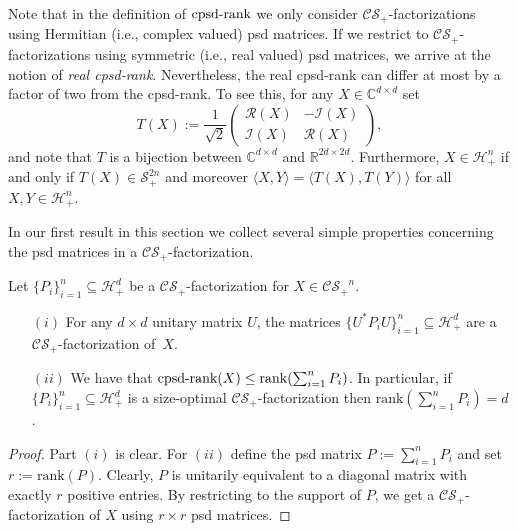 \documentclass{siamart}
\begin{document}
{{{{Note that  in the definition of ${\mathrm{cpsd}\textnormal{-rank}}$ we only consider ${\mathcal{CS}_+}$-factorizations using  Hermitian (i.e., complex valued) psd matrices. If we  restrict to ${\mathcal{CS}_+}$-factorizations using  symmetric (i.e., real valued) psd matrices, we arrive at the notion of {\em real cpsd-rank}.  Nevertheless, the real cpsd-rank can differ at most by a  factor of two from the cpsd-rank.
To see this,  for  any $X\in {\mathbb{C}}^{d\times
d}$ set
 \begin{equation}\label{eq:comtorealpsd}
T(X) := \dfrac{1}{\sqrt 2} \begin{pmatrix} \mathcal{R}(X) & -\mathcal{I}(X)\\ \mathcal{I}(X)&  \mathcal{R}(X)\end{pmatrix},
\end{equation}
and note  that $T$ is a bijection   between ${\mathbb{C}}^{d\times d}$   and   ${\mathbb{R}}^{ 2d\times 2d}$. Furthermore,    $X\in {\mathcal{H}}^n_+$  if and only if $T(X)\in \mathcal{S}^{2n}_+$  and moreover  ${\langle {X}, {Y} \rangle} = {\langle {T(X)}, {T(Y)} \rangle}$ for all $X,Y\in {\mathcal{H}}^n_+$.

In our first result in this section we collect several simple properties concerning  the psd matrices  in a ${\mathcal{CS}_+}$-factorization.

\begin{lemma}\label{lem:fullrank}
Let $\{P_i\}_{i=1}^n\subseteq {\mathcal{H}}^d_+$   be a ${\mathcal{CS}_+}$-factorization for $X\in {\mathcal{CS}_+}^n$.
\begin{itemize}
\item[$(i)$] For any  $d\times d$ unitary  matrix  $U$, the matrices   $\{U^*P_iU\}_{i=1}^n\subseteq {\mathcal{H}}^d_+$ are  a ${\mathcal{CS}_+}$-factorization of~$X$.
\item[$(ii)$] We have that ${\mathrm{cpsd}\textnormal{-rank}}(X)\le {\mathrm{rank}}(\sum_{i=1}^nP_i)$.  In particular, if $\{P_i\}_{i=1}^n \subseteq {\mathcal{H}}^d_+$ is a size-optimal ${\mathcal{CS}_+}$-factorization then  ${\mathrm{rank}}(\sum_{i=1}^nP_i)=d$.
\end{itemize}
\end{lemma}
\medskip 

\begin{proof} Part $(i)$ is clear. For $(ii)$
define the psd matrix $P:=\sum_{i=1}^n P_i$ and set  $r:={\mathrm{rank}}(P)$.  Clearly,  $P$ is unitarily equivalent  to a diagonal matrix with  exactly  $r$  positive entries.
By restricting to the support of $P$, we get a   ${\mathcal{CS}_+}$-factorization of $X$ using $r\times r$ psd matrices.
\end{proof}

}}}}
\end{document}
